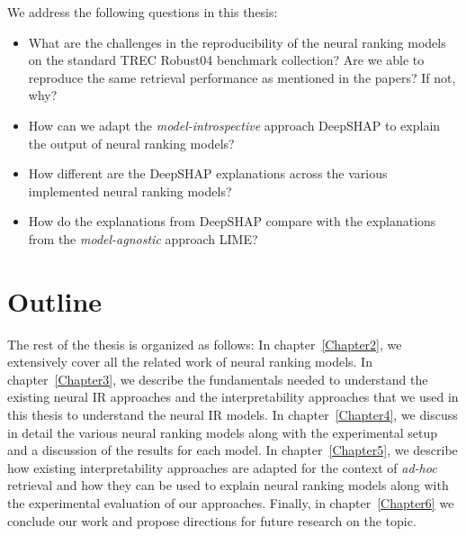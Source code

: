 We address the following questions in this thesis:
\begin{itemize}
    \item What are the challenges in the reproducibility of the neural ranking models on the standard TREC Robust04 benchmark collection? Are we able to reproduce the same retrieval performance as mentioned in the papers? If not, why?\vspace{1em}
    \item How can we adapt the \textit{model-introspective} approach DeepSHAP to explain the output of neural ranking models?
    \item How different are the DeepSHAP explanations across the various implemented neural ranking models?
    \item How do the explanations from DeepSHAP compare with the explanations from the \textit{model-agnostic} approach LIME?
\end{itemize}

\section{Outline}
The rest of the thesis is organized as follows: In chapter~\ref{Chapter2}, we extensively cover all the related work of neural ranking models. In chapter~\ref{Chapter3}, we describe the fundamentals needed to understand the existing neural IR approaches and the interpretability approaches that we used in this thesis to understand the neural IR models. In chapter~\ref{Chapter4}, we discuss in detail the various neural ranking models along with the experimental setup and a discussion of the results for each model. In chapter~\ref{Chapter5}, we describe how existing interpretability approaches are adapted for the context of \textit{ad-hoc} retrieval and how they can be used to explain neural ranking models along with the  experimental evaluation of our approaches. Finally, in chapter~\ref{Chapter6} we conclude our work and propose directions for future research on the topic. 